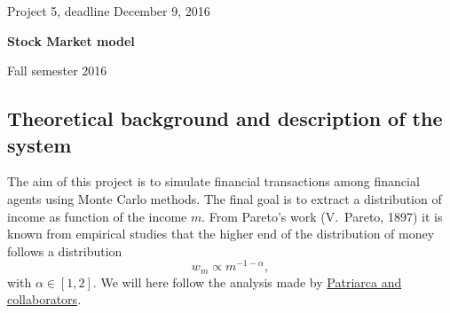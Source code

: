 \documentclass[%
oneside,                 %
final,                   %
10pt]{article}
\begin{document}

\newcommand{\exercisesection}[1]{\subsection*{#1}}






\thispagestyle{empty}

\begin{center}
{\LARGE\bf
\begin{spacing}{1.25}
Project 5, deadline  December 9, 2016
\end{spacing}
}
\end{center}


\begin{center}
{\bf Stock Market model${}^{}$} \\ [0mm]
\end{center}

\begin{center}
\end{center}
    

\begin{center}
Fall semester 2016
\end{center}

\vspace{1cm}


\subsection{Theoretical background and description of the system}

The aim of this project is to simulate financial transactions among financial agents
using Monte Carlo methods. The final goal is to extract a distribution of income  as function
of the income $m$.   From Pareto's work (V.~Pareto, 1897) it is known from empirical studies
that the higher end of the distribution of money follows a distribution 
\[
w_m\propto m^{-1-\alpha},
\]
with $\alpha\in [1,2]$. We will here follow the analysis made by \href{{http://www.sciencedirect.com/science/article/pii/S0378437104004327}}{Patriarca and collaborators}. 
\end{document}
